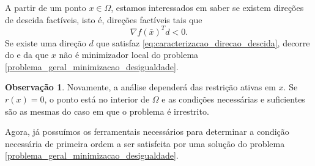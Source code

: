 \documentclass[12pt,a4paper]{scrartcl}
\def\xbar{\bar{x}}
\theoremstyle{definition}%
\newtheorem{obs}{Observação}
\begin{document}
A partir de um ponto $x\in \Omega$, estamos interessados em saber se existem direções de descida factíveis, isto é, direções factíveis tais que
\[ \label{eq:caracterizacao_direcao_descida}
\nabla f(\xbar)^{T}d < 0.
\]
Se existe uma direção $d$ que satisfaz \eqref{eq:caracterizacao_direcao_descida}, decorre do  e da  que $x$ não é minimizador local do problema \eqref{problema_geral_minimizacao_desigualdade}.

\begin{obs}
Novamente, a análise dependerá das restrição ativas em $x$. Se $r(x) =0$, o ponto está no interior de $\Omega$ e as condições necessárias e suficientes são as mesmas do caso em que o problema é irrestrito.
\end{obs}

Agora, já possuímos os ferramentais necessários para determinar a condição necessária de primeira ordem a ser satisfeita por uma solução do problema \eqref{problema_geral_minimizacao_desigualdade}.
\end{document}
